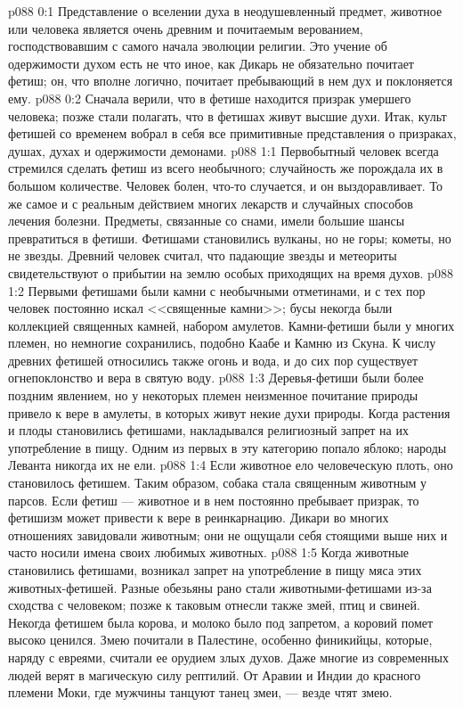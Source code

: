 \vs p088 0:1 Представление о вселении духа в неодушевленный предмет, животное или человека является очень древним и почитаемым верованием, господствовавшим с самого начала эволюции религии. Это учение об одержимости духом есть не что иное, как  Дикарь не обязательно почитает фетиш; он, что вполне логично, почитает пребывающий в нем дух и поклоняется ему.
\vs p088 0:2 Сначала верили, что в фетише находится призрак умершего человека; позже стали полагать, что в фетишах живут высшие духи. Итак, культ фетишей со временем вобрал в себя все примитивные представления о призраках, душах, духах и одержимости демонами.
\vs p088 1:1 Первобытный человек всегда стремился сделать фетиш из всего необычного; случайность же порождала их в большом количестве. Человек болен, что\hyp{}то случается, и он выздоравливает. То же самое и с реальным действием многих лекарств и случайных способов лечения болезни. Предметы, связанные со снами, имели большие шансы превратиться в фетиши. Фетишами становились вулканы, но не горы; кометы, но не звезды. Древний человек считал, что падающие звезды и метеориты свидетельствуют о прибытии на землю особых приходящих на время духов.
\vs p088 1:2 Первыми фетишами были камни с необычными отметинами, и с тех пор человек постоянно искал <<священные камни>>; бусы некогда были коллекцией священных камней, набором амулетов. Камни\hyp{}фетиши были у многих племен, но немногие сохранились, подобно Каабе и Камню из Скуна. К числу древних фетишей относились также огонь и вода, и до сих пор существует огнепоклонство и вера в святую воду.
\vs p088 1:3 Деревья\hyp{}фетиши были более поздним явлением, но у некоторых племен неизменное почитание природы привело к вере в амулеты, в которых живут некие духи природы. Когда растения и плоды становились фетишами, накладывался религиозный запрет на их употребление в пищу. Одним из первых в эту категорию попало яблоко; народы Леванта никогда их не ели.
\vs p088 1:4 Если животное ело человеческую плоть, оно становилось фетишем. Таким образом, собака стала священным животным у парсов. Если фетиш --- животное и в нем постоянно пребывает призрак, то фетишизм может привести к вере в реинкарнацию. Дикари во многих отношениях завидовали животным; они не ощущали себя стоящими выше них и часто носили имена своих любимых животных.
\vs p088 1:5 Когда животные становились фетишами, возникал запрет на употребление в пищу мяса этих животных\hyp{}фетишей. Разные обезьяны рано стали животными\hyp{}фетишами из\hyp{}за сходства с человеком; позже к таковым отнесли также змей, птиц и свиней. Некогда фетишем была корова, и молоко было под запретом, а коровий помет высоко ценился. Змею почитали в Палестине, особенно финикийцы, которые, наряду с евреями, считали ее орудием злых духов. Даже многие из современных людей верят в магическую силу рептилий. От Аравии и Индии до красного племени Моки, где мужчины танцуют танец змеи, --- везде чтят змею.
